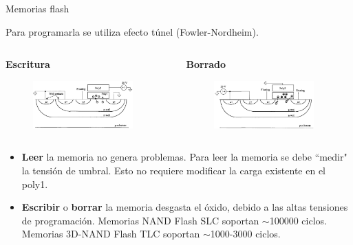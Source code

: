 \documentclass[aspectratio=169,t]{beamer}
\begin{document}
\begin{frame}{Memorias flash}

Para programarla se utiliza efecto túnel (Fowler-Nordheim).

\begin{columns}

\begin{column}{0.5\textwidth}

\centering
\textbf{Escritura}

\begin{figure}[H]
    \centering
    \includegraphics[width=0.9\textwidth]{figuras/flash_1.png}
\end{figure}

\end{column}

\begin{column}{0.5\textwidth}

\centering
\textbf{Borrado}

\begin{figure}[H]
    \centering
    \includegraphics[width=0.9\textwidth]{figuras/flash_2.png}
\end{figure}

\end{column}

\end{columns}

\vspace{5mm}
\begin{itemize}
    \item \textbf{Leer} la memoria no genera problemas. Para leer la memoria se debe ``medir" la tensión de umbral. Esto no requiere modificar la carga existente en el poly1.
    \item \textbf{Escribir} o \textbf{borrar} la memoria desgasta el óxido, debido a las altas  tensiones de programación. Memorias NAND Flash SLC soportan $\sim$100000 ciclos. Memorias 3D-NAND Flash TLC soportan $\sim$1000-3000 ciclos.
\end{itemize}
    
\end{frame}
\end{document}
